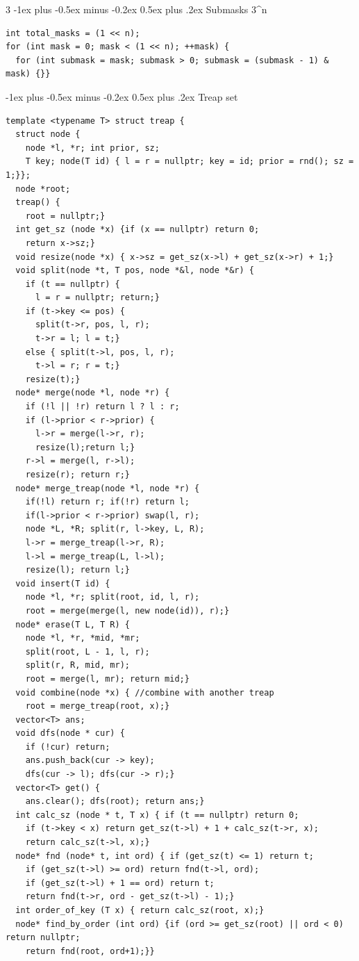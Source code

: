 \documentclass[8pt,a4paper,onesided]{article}
\makeatletter
\renewcommand{\subsection}{\@startsection{subsection}{2}{0mm}
    {-1ex plus -0.5ex minus -0.2ex} %
    {0.5ex plus .2ex}                %
    {\normalfont\large\bfseries}}    %
\makeatother
\begin{document}
\begin{multicols}{3}
\subsection{Submasks 3^n}
\begin{verbatim}
int total_masks = (1 << n);
for (int mask = 0; mask < (1 << n); ++mask) {
  for (int submask = mask; submask > 0; submask = (submask - 1) & mask) {}}
\end{verbatim}
\subsection{Treap set}
\begin{verbatim}
template <typename T> struct treap {
  struct node {
    node *l, *r; int prior, sz;
    T key; node(T id) { l = r = nullptr; key = id; prior = rnd(); sz = 1;}};
  node *root;
  treap() {
    root = nullptr;}
  int get_sz (node *x) {if (x == nullptr) return 0;
    return x->sz;}
  void resize(node *x) { x->sz = get_sz(x->l) + get_sz(x->r) + 1;}
  void split(node *t, T pos, node *&l, node *&r) {
    if (t == nullptr) {
      l = r = nullptr; return;}
    if (t->key <= pos) {
      split(t->r, pos, l, r);
      t->r = l; l = t;}
    else { split(t->l, pos, l, r);
      t->l = r; r = t;}
    resize(t);}
  node* merge(node *l, node *r) {
    if (!l || !r) return l ? l : r;
    if (l->prior < r->prior) {
      l->r = merge(l->r, r);
      resize(l);return l;}
    r->l = merge(l, r->l);
    resize(r); return r;}
  node* merge_treap(node *l, node *r) {
    if(!l) return r; if(!r) return l;
    if(l->prior < r->prior) swap(l, r);
    node *L, *R; split(r, l->key, L, R);
    l->r = merge_treap(l->r, R);
    l->l = merge_treap(L, l->l);
    resize(l); return l;}
  void insert(T id) {
    node *l, *r; split(root, id, l, r);
    root = merge(merge(l, new node(id)), r);}
  node* erase(T L, T R) {
    node *l, *r, *mid, *mr;
    split(root, L - 1, l, r);
    split(r, R, mid, mr);
    root = merge(l, mr); return mid;}
  void combine(node *x) { //combine with another treap
    root = merge_treap(root, x);}
  vector<T> ans;
  void dfs(node * cur) {
    if (!cur) return;
    ans.push_back(cur -> key);
    dfs(cur -> l); dfs(cur -> r);}
  vector<T> get() {
    ans.clear(); dfs(root); return ans;}
  int calc_sz (node * t, T x) { if (t == nullptr) return 0;
    if (t->key < x) return get_sz(t->l) + 1 + calc_sz(t->r, x);
    return calc_sz(t->l, x);}
  node* fnd (node* t, int ord) { if (get_sz(t) <= 1) return t;
    if (get_sz(t->l) >= ord) return fnd(t->l, ord);
    if (get_sz(t->l) + 1 == ord) return t;
    return fnd(t->r, ord - get_sz(t->l) - 1);}
  int order_of_key (T x) { return calc_sz(root, x);}
  node* find_by_order (int ord) {if (ord >= get_sz(root) || ord < 0) return nullptr;
    return fnd(root, ord+1);}}
\end{verbatim}

\end{multicols}
\end{document}
